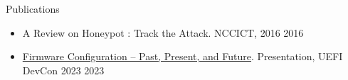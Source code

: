 \documentclass{resume} %
\begin{document}
\begin{rSection}{Publications}

\begin{itemize}
    \item A Review on Honeypot : Track the Attack. NCCICT, 2016 \hfill {2016}
    \item \href{https://uefi.org/sites/default/files/resources/Firmware%20Configuration%20%E2%80%93%20Past%2C%20Present%2C%20and%20Future_Zimmer.pdf}{Firmware Configuration – Past, Present, and Future}. Presentation, UEFI DevCon 2023 \hfill {2023}
\end{itemize}


\end{rSection}
\end{document}
